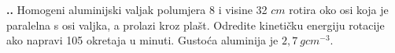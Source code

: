 
\noindent 
\textbf{
\thecjelina.\thezadatak.}
Homogeni aluminijski valjak polumjera 8 i visine 32 $cm$ rotira oko osi koja je paralelna s osi valjka, a prolazi kroz plašt.
Odredite kinetičku energiju rotacije ako napravi 105 okretaja u minuti. Gustoća aluminija je $2,7\ gcm^{-3}$.

